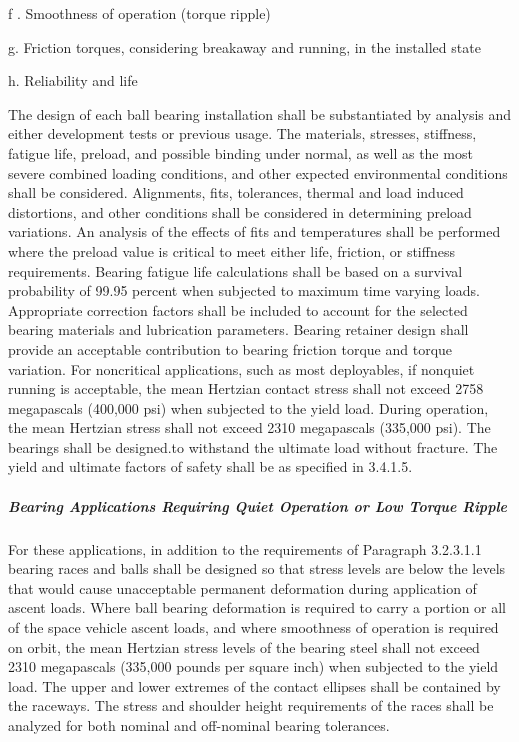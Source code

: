 \documentclass[12pt]{article}
\begin{document}
f . Smoothness of operation (torque ripple)

g. Friction torques, considering breakaway and running, in the installed state

h. Reliability and life

The design of each ball bearing installation shall be substantiated by analysis and either development tests or previous usage. 
The materials, stresses, stiffness, fatigue life, preload, and possible binding under normal, as well as the most severe combined loading conditions, and other expected environmental conditions shall be considered. 
Alignments, fits, tolerances, thermal and load induced distortions, and other conditions shall be considered in determining preload variations. 
An analysis of the effects of fits and temperatures shall be performed where the preload value is critical to meet either life, friction, or stiffness requirements. 
Bearing fatigue life calculations shall be based on a survival probability of 99.95 percent when subjected to maximum time varying loads. 
Appropriate correction factors shall be included to account for the selected bearing materials and lubrication parameters. 
Bearing retainer design shall provide an acceptable contribution to bearing friction torque and torque variation. 
For noncritical applications, such as most deployables, if nonquiet running is acceptable, the mean Hertzian contact stress shall not exceed 2758 megapascals (400,000 psi) when subjected to the yield load. 
During operation, the mean Hertzian stress shall not exceed 2310 megapascals (335,000 psi).
The bearings shall be designed.to withstand the ultimate load without fracture. 
The yield and ultimate factors of safety shall be as specified in 3.4.1.5.

\subparagraph{Bearing Applications Requiring Quiet Operation or Low Torque Ripple} %
For these applications, in addition to the requirements of Paragraph 3.2.3.1.1 bearing races and balls shall be designed so that stress levels are below the levels that would cause unacceptable permanent deformation during application of ascent loads. 
Where ball bearing deformation is required to carry a portion or all of the space vehicle ascent loads, and where smoothness of operation is required on orbit, the mean Hertzian stress levels of the bearing steel shall not exceed 2310 megapascals (335,000 pounds per square inch) when subjected to the yield load. 
The upper and lower extremes of the contact ellipses shall be contained by the raceways. 
The stress and shoulder height requirements of the races shall be analyzed for both nominal and off-nominal bearing tolerances.
\end{document}
